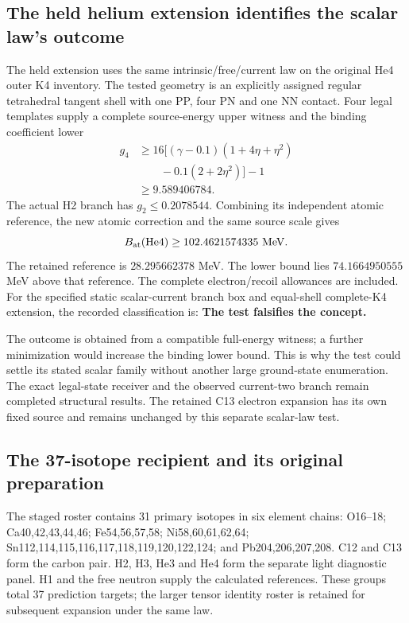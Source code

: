\subsection{The held helium extension identifies the scalar law's outcome}

The held extension uses the same intrinsic/free/current law on the original He4 outer K4 inventory. The tested geometry is an explicitly assigned regular tetrahedral tangent shell with one PP, four PN and one NN contact. Four legal templates supply a complete source-energy upper witness and the binding coefficient lower
\begin{equation}
\begin{aligned}
g_4&\geq16\bigl[(\gamma-0.1)(1+4\eta+\eta^2)\\
&\qquad-0.1(2+2\eta^2)\bigr]-1\\
&\geq9.589406784.
\end{aligned}
\end{equation}
The actual H2 branch has $g_2\leq0.2078544$. Combining its independent atomic reference, the new atomic correction and the same source scale gives
\begin{equation}
B_{\rm at}(\mathrm{He4})\geq102.4621574335\ \mathrm{MeV}.
\end{equation}
The retained reference is $28.295662378$ MeV. The lower bound lies $74.1664950555$ MeV above that reference. The complete electron/recoil allowances are included. For the specified static scalar-current branch box and equal-shell complete-K4 extension, the recorded classification is: \textbf{The test falsifies the concept.}

The outcome is obtained from a compatible full-energy witness; a further minimization would increase the binding lower bound. This is why the test could settle its stated scalar family without another large ground-state enumeration. The exact legal-state receiver and the observed current-two branch remain completed structural results. The retained C13 electron expansion has its own fixed source and remains unchanged by this separate scalar-law test.

\subsection{The 37-isotope recipient and its original preparation}

The staged roster contains 31 primary isotopes in six element chains: O16--18; Ca40,42,43,44,46; Fe54,56,57,58; Ni58,60,61,62,64; Sn112,114,115,116,117,118,119,120,122,124; and Pb204,206,207,208. C12 and C13 form the carbon pair. H2, H3, He3 and He4 form the separate light diagnostic panel. H1 and the free neutron supply the calculated references. These groups total 37 prediction targets; the larger tensor identity roster is retained for subsequent expansion under the same law.

